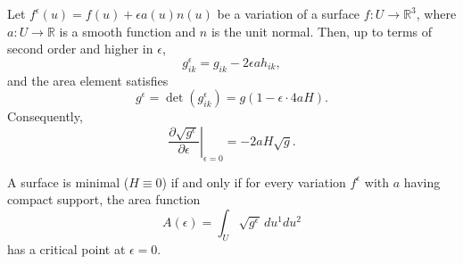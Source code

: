 Let $f^\epsilon(u) = f(u) + \epsilon a(u)n(u)$ be a variation of a surface $f: U \to \mathbb{R}^3$, where $a: U \to \mathbb{R}$ is a smooth function and $n$ is the unit normal. Then, up to terms of second order and higher in $\epsilon$,
$$g_{ik}^\epsilon = g_{ik} - 2\epsilon a h_{ik},$$
and the area element satisfies
$$g^\epsilon = \det(g_{ik}^\epsilon) = g(1 - \epsilon \cdot 4aH).$$
Consequently,
$$\left. \frac{\partial \sqrt{g^\epsilon}}{\partial \epsilon} \right|_{\epsilon=0} = -2aH\sqrt{g}.$$

A surface is minimal ($H \equiv 0$) if and only if for every variation $f^\epsilon$ with $a$ having compact support, the area function
$$A(\epsilon) = \int_U \sqrt{g^\epsilon} \, du^1 du^2$$
has a critical point at $\epsilon = 0$.
